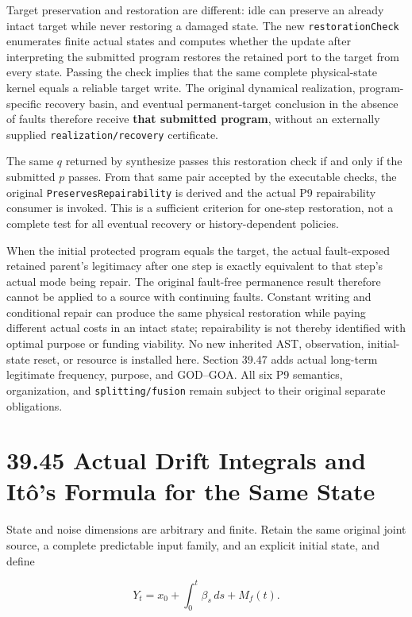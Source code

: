 \documentclass[
  english,
  11pt,
  oneside]{book}
\begin{document}
Target preservation and restoration are different: idle can preserve an already intact target while never restoring a damaged state. The new \nolinkurl{restorationCheck} enumerates finite actual states and computes whether the update after interpreting the submitted program restores the retained port to the target from every state. Passing the check implies that the same complete physical-state kernel equals a reliable target write. The original dynamical realization, program-specific recovery basin, and eventual permanent-target conclusion in the absence of faults therefore receive \textbf{that submitted program}, without an externally supplied \nolinkurl{realization/recovery} certificate.

The same \(q\) returned by synthesize passes this restoration check if and only if the submitted \(p\) passes. From that same pair accepted by the executable checks, the original \nolinkurl{PreservesRepairability} is derived and the actual P9 repairability consumer is invoked. This is a sufficient criterion for one-step restoration, not a complete test for all eventual recovery or history-dependent policies.

When the initial protected program equals the target, the actual fault-exposed retained parent's legitimacy after one step is exactly equivalent to that step's actual mode being repair. The original fault-free permanence result therefore cannot be applied to a source with continuing faults. Constant writing and conditional repair can produce the same physical restoration while paying different actual costs in an intact state; repairability is not thereby identified with optimal purpose or funding viability. No new inherited AST, observation, initial-state reset, or resource is installed here. Section 39.47 adds actual long-term legitimate frequency, purpose, and GOD--GOA. All six P9 semantics, organization, and \nolinkurl{splitting/fusion} remain subject to their original separate obligations.

\section{39.45 Actual Drift Integrals and Itô's Formula for the Same State}\label{actual-drift-integrals-and-ituxf4s-formula-for-the-same-state}

State and noise dimensions are arbitrary and finite. Retain the same original joint source, a complete predictable input family, and an explicit initial state, and define

\[Y_t=x_0+\int_0^t\beta_s\,ds+M_f(t).\]
\end{document}
